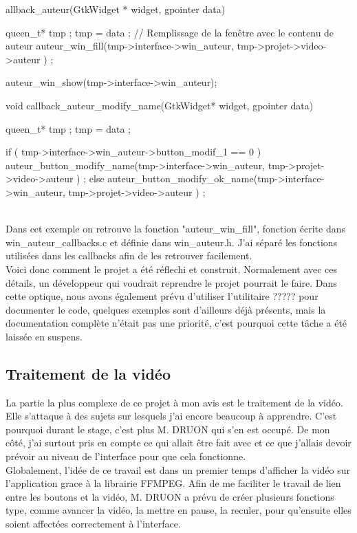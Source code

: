 \documentclass[11pt,french,a4paper]{report}
\begin{document}
allback\_auteur(GtkWidget * widget, gpointer data)
 {
     queen\_t* tmp ;
     tmp = data ;
     // Remplissage de la fenêtre avec le contenu de auteur
     auteur\_win\_fill(tmp->interface->win\_auteur, tmp->projet->video->auteur ) ;

     auteur\_win\_show(tmp->interface->win\_auteur);
 }
 void callback\_auteur\_modify\_name(GtkWidget* widget, gpointer data) {
         queen\_t* tmp ;
         tmp = data ;

         if ( tmp->interface->win\_auteur->button\_modif\_1 == 0 )
         auteur\_button\_modify\_name(tmp->interface->win\_auteur, tmp->projet->video->auteur ) ;
         else
         auteur\_button\_modify\_ok\_name(tmp->interface->win\_auteur, tmp->projet->video->auteur ) ;
   }

\\
Dans cet exemple on retrouve la fonction "auteur\_win\_fill", fonction écrite dans win\_auteur\_callbacks.c et définie
dans win\_auteur.h. J'ai séparé les fonctions utilisées dans les callbacks afin de les retrouver facilement. \\

Voici donc comment le projet a été réflechi et construit. Normalement avec ces détails, un développeur qui voudrait reprendre
le projet pourrait le faire. Dans cette optique, nous avons également prévu d'utiliser %
l'utilitaire ????? pour documenter le code, quelques exemples sont d'ailleurs déjà présents, mais la documentation 
complète n'était pas une priorité, c'est pourquoi cette tâche a été laissée en suspens. 
       
        \subsection{Traitement de la vidéo}
La partie la plus complexe de ce projet à mon avis est le traitement de la vidéo. Elle s'attaque à des sujets sur lesquels j'ai 
encore beaucoup à apprendre. C'est pourquoi durant le stage, c'est plus M. DRUON qui s'en est occupé. De mon côté, j'ai surtout
pris en compte ce qui allait être fait avec et ce que j'allais devoir prévoir au niveau de l'interface pour que cela fonctionne. \\

Globalement, l'idée de ce travail est dans un premier temps d'afficher la vidéo sur l'application grace à 
la librairie FFMPEG. Afin de me faciliter
le travail de lien entre les boutons et la vidéo, M. DRUON a prévu de créer plusieurs fonctions type, comme avancer la vidéo, la 
mettre en pause, la reculer, pour qu'ensuite elles soient affectées correctement à l'interface. \\
\end{document}
